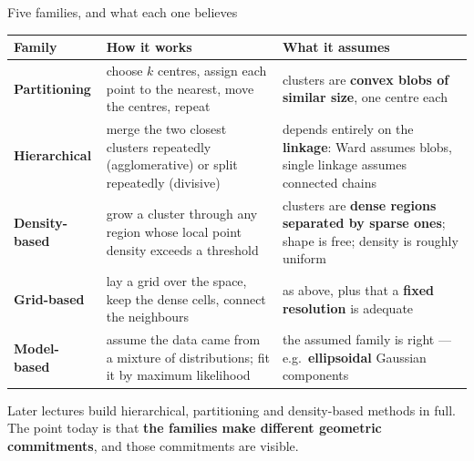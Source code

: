 \documentclass[aspectratio=169]{beamer}
\begin{document}
\begin{frame}[shrink=13]{Five families, and what each one believes}
  \begin{center}
    \small
    \begin{tabular}{@{}lp{4.6cm}p{4.4cm}@{}}
      \toprule
      \textbf{Family} & \textbf{How it works} & \textbf{What it assumes} \\
      \midrule
      \textbf{Partitioning} & choose $k$ centres, assign each point to the
        nearest, move the centres, repeat &
        clusters are \textbf{convex blobs of similar size}, one centre each \\
      \textbf{Hierarchical} & merge the two closest clusters repeatedly
        (agglomerative) or split repeatedly (divisive) &
        depends entirely on the \textbf{linkage}: Ward assumes blobs,
        single linkage assumes connected chains \\
      \textbf{Density-based} & grow a cluster through any region whose local
        point density exceeds a threshold &
        clusters are \textbf{dense regions separated by sparse ones}; shape
        is free; density is roughly uniform \\
      \textbf{Grid-based} & lay a grid over the space, keep the dense cells,
        connect the neighbours &
        as above, plus that a \textbf{fixed resolution} is adequate \\
      \textbf{Model-based} & assume the data came from a mixture of
        distributions; fit it by maximum likelihood &
        the assumed family is right --- e.g.\ \textbf{ellipsoidal} Gaussian
        components \\
      \bottomrule
    \end{tabular}
  \end{center}
  \begin{center}\small
    Later lectures build hierarchical, partitioning and density-based
    methods in full. The point today is that \textbf{the families make
    different geometric commitments}, and those commitments are visible.
  \end{center}
\end{frame}
\end{document}
